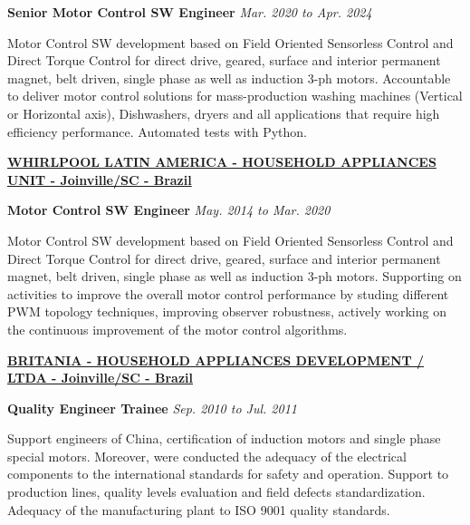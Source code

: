 \documentclass[10pt]{article}
\begin{document}
\begin{outerlist}

\item[] \textbf{Senior Motor Control SW Engineer}%
    \hfill \textit{Mar. 2020 to Apr. 2024}
    \begin{innerlist}
        \item Motor Control SW development based on Field Oriented Sensorless Control and Direct Torque Control for direct drive, geared, surface and interior permanent magnet, belt driven, single phase as well as induction 3-ph motors. Accountable to deliver motor control solutions for mass-production washing machines (Vertical or Horizontal axis), Dishwashers, dryers and all applications that require high efficiency performance. Automated tests with Python.
    \end{innerlist}
\end{outerlist}

\blankline

\href{http://www.whirlpool.com/}{\textbf{WHIRLPOOL LATIN AMERICA - HOUSEHOLD APPLIANCES UNIT - Joinville/SC - Brazil}}

\begin{outerlist}

\item[] \textbf{Motor Control SW Engineer}%
    \hfill \textit{May. 2014 to Mar. 2020}
    \begin{innerlist}
        \item Motor Control SW development based on Field Oriented Sensorless Control and Direct Torque Control for direct drive, geared, surface and interior permanent magnet, belt driven, single phase as well as induction 3-ph motors. Supporting on activities to improve the overall motor control performance by studing different PWM topology techniques, improving observer robustness, actively working on the continuous improvement of the motor control algorithms. 
    \end{innerlist}
\end{outerlist}

\blankline

\href{http://www.britania.com.br/}{\textbf{BRITANIA - HOUSEHOLD APPLIANCES DEVELOPMENT / LTDA - Joinville/SC - Brazil}}

\begin{outerlist}

\item[] \textbf{Quality Engineer Trainee}%
    \hfill \textit{Sep. 2010 to Jul. 2011}
    \begin{innerlist}
        \item Support engineers of China, certification of induction motors and single phase special motors. Moreover, were conducted the adequacy of the electrical components to the international standards for safety and operation. Support to production lines, quality levels evaluation and field defects standardization. Adequacy of the manufacturing plant to ISO 9001 quality standards.
    \end{innerlist}
\end{outerlist}
\end{document}
